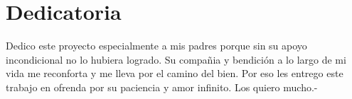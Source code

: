 \chapter{Dedicatoria}

Dedico este proyecto especialmente a mis padres porque sin su apoyo incondicional no lo hubiera logrado. Su compañia y bendición a lo largo de mi vida me reconforta y me lleva por el camino del bien. Por eso les entrego este trabajo en ofrenda por su paciencia y amor infinito. Los quiero mucho.-